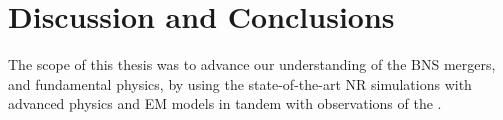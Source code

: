 \chapter{Discussion and Conclusions}\label{ch:conclusion} %













The scope of this thesis was to advance our understanding of the \ac{BNS} mergers,
and fundamental physics, by using the state-of-the-art \ac{NR} simulations with
advanced physics and \ac{EM} models in tandem with \mm{} observations of the 
\GW{}. 





